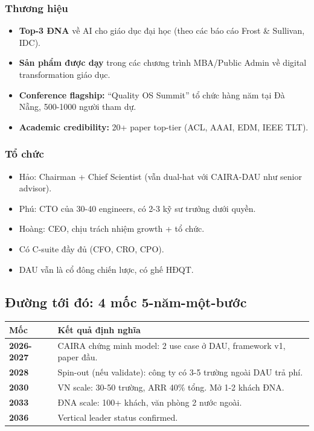 \documentclass[11pt,a4paper]{article}
\begin{document}
\subsubsection*{Thương hiệu}
\begin{itemize}
\item \textbf{Top-3 ĐNA} về AI cho giáo dục đại học (theo các báo cáo Frost \& Sullivan, IDC).
\item \textbf{Sản phẩm được dạy} trong các chương trình MBA/Public Admin về digital transformation giáo dục.
\item \textbf{Conference flagship:} ``Quality OS Summit'' tổ chức hàng năm tại Đà Nẵng, 500-1000 người tham dự.
\item \textbf{Academic credibility:} 20+ paper top-tier (ACL, AAAI, EDM, IEEE TLT).
\end{itemize}

\subsubsection*{Tổ chức}
\begin{itemize}
\item Hảo: Chairman + Chief Scientist (vẫn dual-hat với CAIRA-DAU như senior advisor).
\item Phú: CTO của 30-40 engineers, có 2-3 kỹ sư trưởng dưới quyền.
\item Hoàng: CEO, chịu trách nhiệm growth + tổ chức.
\item Có C-suite đầy đủ (CFO, CRO, CPO).
\item DAU vẫn là cổ đông chiến lược, có ghế HĐQT.
\end{itemize}

\subsection{Đường tới đó: 4 mốc 5-năm-một-bước}

\begin{tabularx}{\linewidth}{@{}p{1.5cm} X@{}}
\toprule
\textbf{Mốc} & \textbf{Kết quả định nghĩa} \\
\midrule
\textbf{2026-2027} & CAIRA chứng minh model: 2 use case ở DAU, framework v1, paper đầu. \\
\textbf{2028} & Spin-out (nếu validate): công ty có 3-5 trường ngoài DAU trả phí. \\
\textbf{2030} & VN scale: 30-50 trường, ARR 40\% tổng. Mở 1-2 khách ĐNA. \\
\textbf{2033} & ĐNA scale: 100+ khách, văn phòng 2 nước ngoài. \\
\textbf{2036} & Vertical leader status confirmed. \\
\bottomrule
\end{tabularx}
\end{document}
